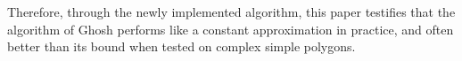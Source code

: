 Therefore, through the newly implemented algorithm, this paper \cite{maleki2022implementation} testifies that the algorithm of Ghosh \cite{GHOSH2010718} performs like a constant approximation in practice, and often better than its bound when tested on complex simple polygons.
